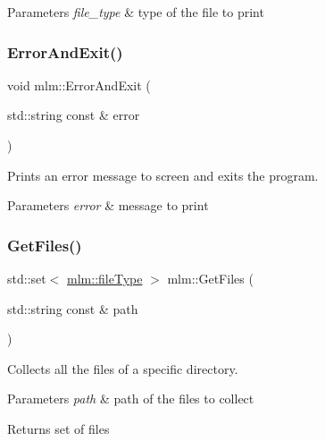 \begin{DoxyParams}{Parameters}
{\em file\+\_\+type} & type of the file to print \\
\hline
\end{DoxyParams}
\mbox{\label{namespacemlm_ac4e5fd55f7a10778ef7b1d3cdc321331}} 
\subsubsection{\texorpdfstring{Error\+And\+Exit()}{ErrorAndExit()}}
{\footnotesize\ttfamily void mlm\+::\+Error\+And\+Exit (\begin{DoxyParamCaption}\item[{std\+::string const \&}]{error }\end{DoxyParamCaption})}



Prints an error message to screen and exits the program. 


\begin{DoxyParams}{Parameters}
{\em error} & message to print \\
\hline
\end{DoxyParams}
\mbox{\label{namespacemlm_a642c9c6f568a7faf5b14558678a85662}} 
\subsubsection{\texorpdfstring{Get\+Files()}{GetFiles()}}
{\footnotesize\ttfamily std\+::set$<$ \mbox{\hyperlink{structmlm_1_1fileType}{mlm\+::file\+Type}} $>$ mlm\+::\+Get\+Files (\begin{DoxyParamCaption}\item[{std\+::string const \&}]{path }\end{DoxyParamCaption})}



Collects all the files of a specific directory. 


\begin{DoxyParams}{Parameters}
{\em path} & path of the files to collect \\
\hline
\end{DoxyParams}
\begin{DoxyReturn}{Returns}
set of files 
\end{DoxyReturn}
\mbox{\label{namespacemlm_a2f0ff65f0ef9855ab83fc2866291e06e}} 
